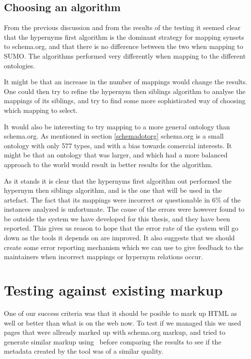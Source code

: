 \subsection{Choosing an algorithm}
From the previous discussion and from the results of the testing it seemed clear that the hypernyms first algorithm is
the dominant strategy for mapping synsets to schema.org, and that there is no difference between the two when mapping to SUMO.
The algorithms performed very differently when mapping to the different ontologies.

It might be that an increase in the number of mappings would change the results.
One could then try to refine the hypernym then siblings algorithm to analyse the mappings of its siblings,
and try to find some more sophisticated way of choosing which mapping to select.

It would also be interesting to try mapping to a more general ontology than schema.org.
As mentioned in section \ref{schemadotorg} schema.org is a small ontology with only 577 types,
and with a bias towards comercial interests.
It might be that an ontology that was larger,
and which had a more balanced approach to the world would result in better results for the algorithm.

As it stands it is clear that the hypernyms first algorithm out performed the hypernym then siblings algorithm,
and is the one that will be used in the artefact.
The fact that its mappings were incorrect or questionable in 6\% of the instances analyzed is unfortunate.
The cause of the errors were however found to be outside the system we have developed for this thesis,
and they have been reported.
This gives us reason to hope that the error rate of the system will go down as the tools it depends on are improved.
It also suggests that we should create some error reporting mechanism which we can use to give feedback to the maintainers
when incorrect mappings or hypernym relations occur.


\section{Testing against existing markup}
One of our success criteria was that it should be posible to mark up HTML as well or better than what is on the web now.
To test if we managed this we used pages that were allready marked up with schema.org markup,
and tried to generate similar markup using \theartefact\ before comparing the results to see if the metadata created
by the tool was of a similar quality.

